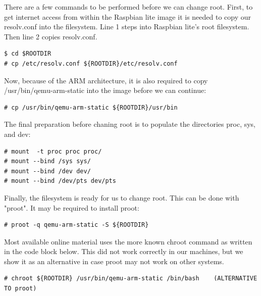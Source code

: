 There are a few commands to be performed before we can change root.
First, to get internet access from within the Raspbian lite image it is needed
to copy our resolv.conf into the filesystem. Line 1 steps into Raspbian lite's
root filesystem. Then line 2 copies resolv.conf.

\begin{lstlisting}[]
$ cd $ROOTDIR
# cp /etc/resolv.conf ${ROOTDIR}/etc/resolv.conf
\end{lstlisting}
\FloatBarrier
\vspace{-5mm}

Now, because of the ARM architecture, it is also required to copy
/usr/bin/qemu-arm-static into the image before we can continue:

\begin{lstlisting}[]
# cp /usr/bin/qemu-arm-static ${ROOTDIR}/usr/bin
\end{lstlisting}
\FloatBarrier
\vspace{-5mm}

The final preparation before chaning root is to populate the directories proc,
sys, and dev:

\begin{lstlisting}[]
# mount  -t proc proc proc/
# mount --bind /sys sys/
# mount --bind /dev dev/
# mount --bind /dev/pts dev/pts
\end{lstlisting}
\FloatBarrier
\vspace{-5mm}

Finally, the filesystem is ready for us to change root. This can be done with
"proot". It may be required to install proot:

\begin{lstlisting}[]
# proot -q qemu-arm-static -S ${ROOTDIR}
\end{lstlisting}
\FloatBarrier
\vspace{-5mm}

Most available online material uses the more known chroot command as written in
the code block below. This did not work correctly in our machines, but we show
it as an alternative in case proot may not work on other systems.

\begin{lstlisting}[]
# chroot ${ROOTDIR} /usr/bin/qemu-arm-static /bin/bash    (ALTERNATIVE TO proot)
\end{lstlisting}
\FloatBarrier
\vspace{-5mm}

